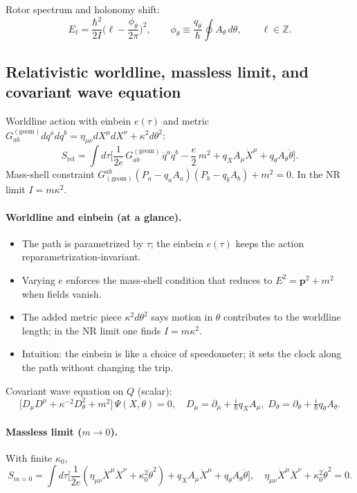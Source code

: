 Rotor spectrum and holonomy shift:
\begin{equation}
 E_\ell=\frac{\hbar^2}{2I}\Big(\ell-\frac{\phi_\theta}{2\pi}\Big)^2,\qquad \phi_\theta\equiv\frac{q_\theta}{\hbar}\oint A_\theta\,d\theta,\qquad \ell\in\mathbb Z.
\end{equation}

\subsection{Relativistic worldline, massless limit, and covariant wave equation}\label{sec:relativistic-worldline}
Worldline action with einbein $e(\tau)$ and metric $G^{(\mathrm{geom})}_{ab}dq^adq^b=\eta_{\mu\nu}dX^\mu dX^\nu+\kappa^2 d\theta^2$:
\begin{equation}
 S_{\mathrm{rel}}=\int d\tau\Big[\frac{1}{2e}\,G^{(\mathrm{geom})}_{ab}\,\dot q^a\dot q^b - \frac{e}{2}\,m^2 + q_X A_\mu\dot X^\mu + q_\theta A_\theta\dot\theta\Big].
\end{equation}
Mass-shell constraint $G^{ab}_{\mathrm{(geom)}}(P_a-q_aA_a)(P_b-q_bA_b)+m^2=0$. In the NR limit $I=m\kappa^2$.

\paragraph{Worldline and einbein (at a glance).}
\begin{itemize}
  \item The path is parametrized by $\tau$; the einbein $e(\tau)$ keeps the action reparametrization-invariant.
  \item Varying $e$ enforces the mass-shell condition that reduces to $E^2=\bm p^2+m^2$ when fields vanish.
  \item The added metric piece $\kappa^2 d\theta^2$ says motion in $\theta$ contributes to the worldline length; in the NR limit one finds $I=m\kappa^2$.
  \item Intuition: the einbein is like a choice of speedometer; it sets the clock along the path without changing the trip.
\end{itemize}

Covariant wave equation on $Q$ (scalar):
\begin{equation}
 \big[D_\mu D^\mu + \kappa^{-2} D_\theta^2 + m^2\big]\,\Psi(X,\theta)=0,\quad D_\mu=\partial_\mu+\tfrac{i}{\hbar}q_XA_\mu,\; D_\theta=\partial_\theta+\tfrac{i}{\hbar}q_\theta A_\theta.
\end{equation}

\paragraph{Massless limit (\texorpdfstring{$m\to 0$}{m->0}).} With finite $\kappa_0$,
\begin{equation}
 S_{m=0}=\int d\tau\Big[\frac{1}{2e}(\eta_{\mu\nu}\dot X^\mu\dot X^\nu+\kappa_0^2\dot\theta^2)+q_X A_\mu\dot X^\mu+q_\theta A_\theta\dot\theta\Big],\quad \eta_{\mu\nu}\dot X^\mu\dot X^\nu+\kappa_0^2\dot\theta^2=0.
\end{equation}


